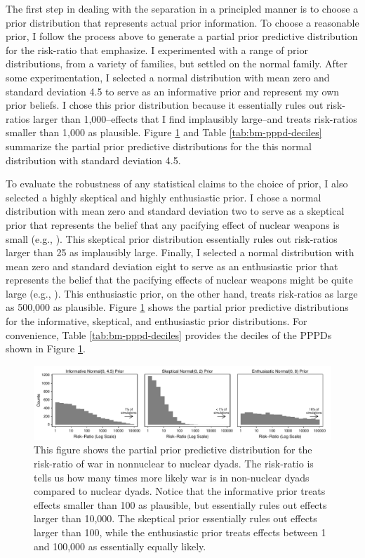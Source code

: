 \documentclass[12pt]{article}
\begin{document}
The first step in dealing with the separation in a principled manner is to choose a prior distribution that represents actual prior information. To choose a reasonable prior, I follow the process above to generate a partial prior predictive distribution for the risk-ratio that \cite{BellMiller2014} emphasize. I experimented with a range of prior distributions, from a variety of families, but settled on the normal family. After some experimentation, I selected a normal distribution with mean zero and standard deviation 4.5 to serve as an informative prior and represent my own prior beliefs. I chose this prior distribution because it essentially rules out risk-ratios larger than 1,000--effects that I find implausibly large--and treats risk-ratios smaller than 1,000 as plausible. Figure \ref{fig:bm-pppd-hist} and Table \ref{tab:bm-pppd-deciles} summarize the partial prior predictive distributions for the this normal distribution with standard deviation 4.5.

To evaluate the robustness of any statistical claims to the choice of prior, I also selected a highly skeptical and highly enthusiastic prior. I chose a normal distribution with mean zero and standard deviation two to serve as a skeptical prior that represents the belief that any pacifying effect of nuclear weapons is small (e.g., \citealt{Mueller1988}). This skeptical prior distribution essentially rules out risk-ratios larger than 25 as implausibly large. Finally, I selected a normal distribution with mean zero and standard deviation eight to serve as an enthusiastic prior that represents the belief that the pacifying effects of nuclear weapons might be quite large (e.g., \citealt{Mearsheimer1993}). This enthusiastic prior, on the other hand, treats risk-ratios as large as 500,000 as plausible. 
Figure \ref{fig:bm-pppd-hist} shows the partial prior predictive distributions for the informative, skeptical, and enthusiastic prior distributions. For convenience, Table \ref{tab:bm-pppd-deciles} provides the deciles of the PPPDs shown in Figure \ref{fig:bm-pppd-hist}. 

\begin{figure}[H]
\begin{center}
\includegraphics[scale = .8]{figs/bm-pppd-hist.pdf}
\caption{This figure shows the partial prior predictive distribution for the risk-ratio of war in nonnuclear to nuclear dyads. The risk-ratio is tells us how many times more likely war is in non-nuclear dyads compared to nuclear dyads. Notice that the informative prior treats effects smaller than 100 as plausible, but essentially rules out effects larger than 10,000. The skeptical prior essentially rules out effects larger than 100, while the enthusiastic prior treats effects between 1 and 100,000 as essentially equally likely.}\label{fig:bm-pppd-hist}
\end{center}
\end{figure}
\end{document}
